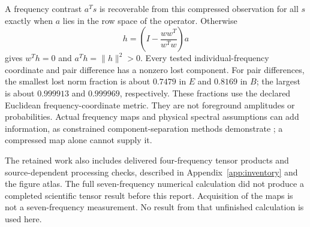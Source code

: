 A frequency contrast $a^Ts$ is recoverable from this compressed observation for all $s$ exactly when $a$ lies in the row space of the operator. Otherwise
\begin{equation}
 h=\left(I-\frac{ww^T}{w^Tw}\right)a
\end{equation}
gives $w^Th=0$ and $a^Th=\|h\|^2>0$. Every tested individual-frequency coordinate and pair difference has a nonzero lost component. For pair differences, the smallest lost norm fraction is about $0.7479$ in $E$ and $0.8169$ in $B$; the largest is about $0.999913$ and $0.999969$, respectively. These fractions use the declared Euclidean frequency-coordinate metric. They are not foreground amplitudes or probabilities. Actual frequency maps and physical spectral assumptions can add information, as constrained component-separation methods demonstrate \cite{Remazeilles2011,Remazeilles2021}; a compressed map alone cannot supply it.

The retained work also includes delivered four-frequency tensor products and source-dependent processing checks, described in Appendix~\ref{app:inventory} and the figure atlas. The full seven-frequency numerical calculation did not produce a completed scientific tensor result before this report. Acquisition of the maps is not a seven-frequency measurement. No result from that unfinished calculation is used here.
